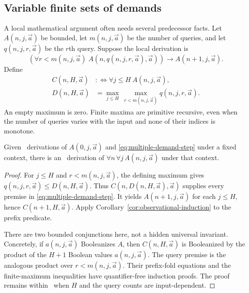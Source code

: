 \subsection{Variable finite sets of demands}

A local mathematical argument often needs several predecessor facts.
Let $A(n,j,\vec a)$ be bounded, let $m(n,j,\vec a)$ be the number of
queries, and let $q(n,j,r,\vec a)$ be the $r$th query.  Suppose the local
derivation is
\begin{equation}\label{eq:multiple-demand-step}
 \left(\forall r<m(n,j,\vec a)\;
 A(n,q(n,j,r,\vec a),\vec a)\right)
       \longrightarrow A(n+1,j,\vec a).
\end{equation}
Define
\begin{align}
 C(n,H,\vec a)&:\Longleftrightarrow
       \forall j\le H\ A(n,j,\vec a),\label{eq:prefix-observations}\\
 D(n,H,\vec a)&=
       \max_{j\le H}\ \max_{r<m(n,j,\vec a)}q(n,j,r,\vec a).
       \label{eq:multiple-demand-envelope}
\end{align}
An empty maximum is zero.  Finite maxima are primitive recursive, even
when the number of queries varies with the input and none of their indices
is monotone.

\begin{corollary}
\label{cor:finite-query-induction}
Given \ipra\ derivations of $A(0,j,\vec a)$ and
\eqref{eq:multiple-demand-step} under a fixed context, there is an \ipra\
derivation of $\forall n\,\forall j\,A(n,j,\vec a)$ under that context.
\end{corollary}

\begin{proof}
For $j\le H$ and $r<m(n,j,\vec a)$, the defining maximum gives
$q(n,j,r,\vec a)\le D(n,H,\vec a)$.  Thus $C(n,D(n,H,\vec a),\vec a)$
supplies every premise in \eqref{eq:multiple-demand-step}.  It yields
$A(n+1,j,\vec a)$ for each $j\le H$, hence $C(n+1,H,\vec a)$.
Apply Corollary~\ref{cor:observational-induction} to the prefix predicate.

There are two bounded conjunctions here, not a hidden universal invariant.
Concretely, if $a(n,j,\vec a)$ Booleanizes $A$, then $C(n,H,\vec a)$ is
Booleanized by the product of the $H+1$ Boolean values $a(n,j,\vec a)$.
The query premise is the analogous product over $r<m(n,j,\vec a)$.
Their prefix-fold equations and the finite-maximum inequalities have
quantifier-free induction proofs.  The proof remains within \ipra\ when
$H$ and the query counts are input-dependent.
\end{proof}

